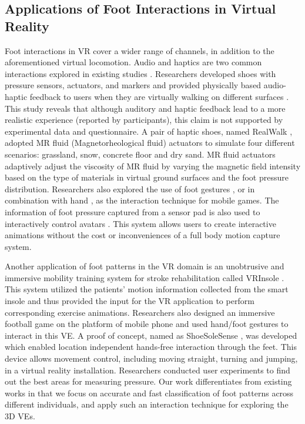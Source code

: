 \documentclass[review]{vgtc}                 %
\begin{document}
\subsection{Applications of Foot Interactions in Virtual Reality} 
Foot interactions in VR cover a wider range of channels, in addition to the aforementioned virtual locomotion.
Audio and haptics are two common interactions explored in existing studies \cite{nordahl2010preliminary,nordahl2011sound,papetti2010audio,nordahl2011multimodal,nordahl2012enhancing}.
Researchers developed shoes with pressure sensors, actuators, and markers and provided physically based audio-haptic feedback to users when they are virtually walking on different surfaces \cite{nordahl2012enhancing}.
This study reveals that although auditory and haptic feedback lead to a more realistic experience (reported by participants), this claim is not supported by experimental data and questionnaire.
A pair of haptic shoes, named RealWalk \cite{son2018realwalk}, adopted MR fluid (Magnetorheological fluid) actuators to simulate four different scenarios: grassland, snow, concrete floor and dry sand. 
MR fluid actuators adaptively adjust the viscosity of MR fluid by varying the magnetic field intensity based on the type of materials in virtual ground surfaces and the foot pressure distribution. 
Researchers also explored the use of foot gestures \cite{lv2014foot}, or in combination with hand \cite{lu2013hand}, as the interaction technique for mobile games. 
The information of foot pressure captured from a sensor pad is also used to interactively control avatars \cite{yin2003footsee}.
This system allows users to create interactive animations without the cost or inconveniences of a full body motion capture system.

Another application of foot patterns in the VR domain is an unobtrusive and immersive mobility training system for stroke rehabilitation called VRInsole \cite{oagaz2018vrinsole}. 
This system utilized the patients' motion information collected from the smart insole and thus provided the input for the VR application to perform corresponding exercise animations. 
Researchers \cite{lu2013hand} also designed an immersive football game on the platform of mobile phone and used hand/foot gestures to interact in this VE.
A proof of concept, named as ShoeSoleSense \cite{matthies2013shoesolesense}, was developed which enabled location independent hands-free interaction through the feet.
This device allows movement control, including moving straight, turning and jumping, in a virtual reality installation.
Researchers conducted user experiments to find out the best areas for measuring pressure.
Our work differentiates from existing works in that we focus on accurate and fast classification of foot patterns across different individuals, and apply such an interaction technique for exploring the 3D VEs.
\end{document}
